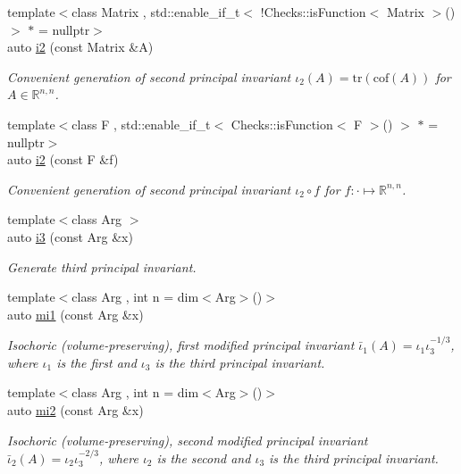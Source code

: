 \begin{DoxyCompactItemize}
{\footnotesize template$<$class Matrix , std\-::enable\-\_\-if\-\_\-t$<$ !\-Checks\-::is\-Function$<$ Matrix $>$() $>$ $\ast$  = nullptr$>$ }\\auto \hyperlink{group__InvariantGroup_ga9e442bab8f203bcd5634a3d0e65bf802}{i2} (const Matrix \&A)
\begin{DoxyCompactList}\small\item\em Convenient generation of second principal invariant $ \iota_2(A)=\mathrm{tr}(\mathrm{cof}(A)) $ for $A\in\mathbb{R}^{n,n}$. \end{DoxyCompactList}\item 
{\footnotesize template$<$class F , std\-::enable\-\_\-if\-\_\-t$<$ Checks\-::is\-Function$<$ F $>$() $>$ $\ast$  = nullptr$>$ }\\auto \hyperlink{group__InvariantGroup_gad3987f97353c8696e602ed1915b3cf47}{i2} (const F \&f)
\begin{DoxyCompactList}\small\item\em Convenient generation of second principal invariant $ \iota_2\circ f $ for $f:\cdot\mapsto\mathbb{R}^{n,n}$. \end{DoxyCompactList}\item 
{\footnotesize template$<$class Arg $>$ }\\auto \hyperlink{group__InvariantGroup_gae1ad80b4b2f34a10564114fad28bc313}{i3} (const Arg \&x)
\begin{DoxyCompactList}\small\item\em Generate third principal invariant. \end{DoxyCompactList}\item 
{\footnotesize template$<$class Arg , int n = dim$<$\-Arg$>$()$>$ }\\auto \hyperlink{group__InvariantGroup_ga7eed5e2661171d81e192ac1db791244c}{mi1} (const Arg \&x)
\begin{DoxyCompactList}\small\item\em Isochoric (volume-\/preserving), first modified principal invariant $ \bar\iota_1(A)=\iota_1\iota_3^{-1/3} $, where $\iota_1$ is the first and $\iota_3$ is the third principal invariant. \end{DoxyCompactList}\item 
{\footnotesize template$<$class Arg , int n = dim$<$\-Arg$>$()$>$ }\\auto \hyperlink{group__InvariantGroup_ga9d219c5c48cce1d3af60345916963524}{mi2} (const Arg \&x)
\begin{DoxyCompactList}\small\item\em Isochoric (volume-\/preserving), second modified principal invariant $ \bar\iota_2(A)=\iota_2\iota_3^{-2/3} $, where $\iota_2$ is the second and $\iota_3$ is the third principal invariant. \end{DoxyCompactList}\item 

\end{DoxyCompactItemize}
